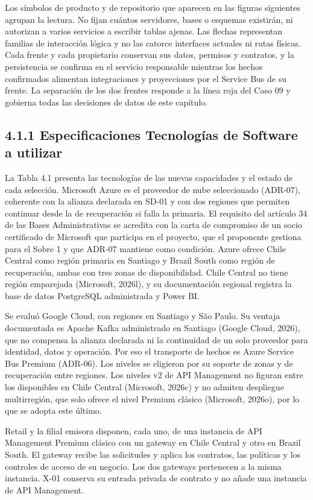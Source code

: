 \documentclass[11pt]{article}
\begin{document}
Los símbolos de producto y de repositorio que aparecen en las figuras siguientes agrupan la lectura. No fijan cuántos servidores, bases o esquemas existirán, ni autorizan a varios servicios a escribir tablas ajenas. Las flechas representan familias de interacción lógica y no las catorce interfaces actuales ni rutas físicas. Cada frente y cada propietario conservan sus datos, permisos y contratos, y la persistencia se confirma en el servicio responsable mientras los hechos confirmados alimentan integraciones y proyecciones por el Service Bus de su frente. La separación de los dos frentes responde a la línea roja del Caso 09 y gobierna todas las decisiones de datos de este capítulo.

\subsection{4.1.1 Especificaciones Tecnologías de Software a utilizar}

La Tabla 4.1 presenta las tecnologías de las nuevas capacidades y el estado de cada selección. Microsoft Azure es el proveedor de nube seleccionado (ADR-07), coherente con la alianza declarada en SD-01 y con dos regiones que permiten continuar desde la de recuperación si falla la primaria. El requisito del artículo 34 de las Bases Administrativas se acredita con la carta de compromiso de un socio certificado de Microsoft que participa en el proyecto, que el proponente gestiona para el Sobre 1 y que ADR-07 mantiene como condición. Azure ofrece Chile Central como región primaria en Santiago y Brazil South como región de recuperación, ambas con tres zonas de disponibilidad. Chile Central no tiene región emparejada (Microsoft, 2026l), y su documentación regional registra la base de datos PostgreSQL administrada y Power BI.

Se evaluó Google Cloud, con regiones en Santiago y São Paulo. Su ventaja documentada es Apache Kafka administrado en Santiago (Google Cloud, 2026), que no compensa la alianza declarada ni la continuidad de un solo proveedor para identidad, datos y operación. Por eso el transporte de hechos es Azure Service Bus Premium (ADR-06). Los niveles se eligieron por su soporte de zonas y de recuperación entre regiones. Los niveles v2 de API Management no figuran entre los disponibles en Chile Central (Microsoft, 2026c) y no admiten despliegue multirregión, que solo ofrece el nivel Premium clásico (Microsoft, 2026o), por lo que se adopta este último.

Retail y la filial emisora disponen, cada uno, de una instancia de API Management Premium clásico con un gateway en Chile Central y otro en Brazil South. El gateway recibe las solicitudes y aplica los contratos, las políticas y los controles de acceso de su negocio. Los dos gateways pertenecen a la misma instancia. X-01 conserva su entrada privada de contrato y no añade una instancia de API Management.
\end{document}
